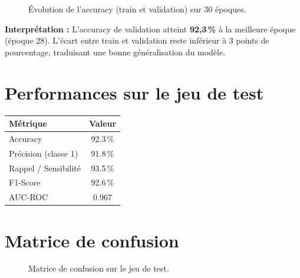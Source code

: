 \documentclass[12pt, a4paper]{report}
\begin{document}
\begin{figure}[h]
  \centering
  \caption{Évolution de l'accuracy (train et validation) sur 30 époques.}
  \label{fig:acc_curve}
\end{figure}

\textbf{Interprétation :} L'accuracy de validation atteint \textbf{92,3\,\%}
à la meilleure époque (époque 28).
L'écart entre train et validation reste inférieur à 3 points de pourcentage,
traduisant une bonne généralisation du modèle.

\section{Performances sur le jeu de test}

\begin{center}
\begin{tabular}{@{}lc@{}}
  \toprule
  \textbf{Métrique}            & \textbf{Valeur} \\
  \midrule
  Accuracy                     & 92.3\,\% \\
  Précision (classe 1)         & 91.8\,\% \\
  Rappel / Sensibilité         & 93.5\,\% \\
  F1-Score                     & 92.6\,\% \\
  AUC-ROC                      & 0.967 \\
  \bottomrule
\end{tabular}
\end{center}

\section{Matrice de confusion}

\begin{figure}[h]
  \centering
  \caption{Matrice de confusion sur le jeu de test.}
  \label{fig:cm}
\end{figure}
\end{document}

